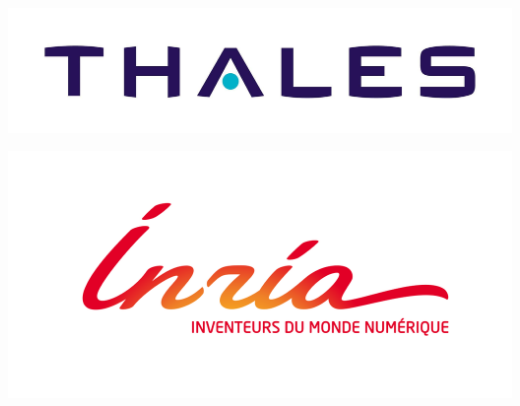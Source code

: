 \documentclass[12pt]{article}
\begin{document}
\begin{titlepage}
    \begin{minipage}[c]{0.45\linewidth}
        \hspace{-2cm}\includegraphics[width=1.4\linewidth]{./assets/thales}
    \end{minipage} \hfill
    \begin{minipage}[c]{0.45\linewidth}
        \includegraphics[width=1.4\linewidth]{./assets/inria}
    \end{minipage}

\end{titlepage}

\newpage


\newcommand{\norm}[1]{\left\lVert\: #1 \:\right\rVert}
\newcommand\bsum{\mathlarger{\sum}}          %
\newcommand\discountedReward{\sum_{k=0}^{\infty} \gamma^kR_{t+k+1}}
\newcommand\valueFunction{\mathbb{E_\pi}\bigg(\sum_{k=0}^{\infty} \gamma^kR_{t+k+1}  \:\bigg\vert\: s_t=s \bigg)}
\newcommand\QFunction{\mathbb{E_\pi}\bigg(\sum_{k=0}^{\infty} \gamma^kR_{t+k+1}  \:\bigg\vert\: s_t=s, a_t=a \bigg)}

\newcommand{\policyc}[1]{
    \textcolor{#1}{
        \underbrace{\pi(x\:,\:a)}_{p\:(a \:\vert\: s)}
    }
}

\newcommand{\dynamicsc}[1]{
    \textcolor{#1}{
        \overbrace{T(s',r , s, a)}^{p(s',r \vert s, a)}
    }
}
\end{document}
